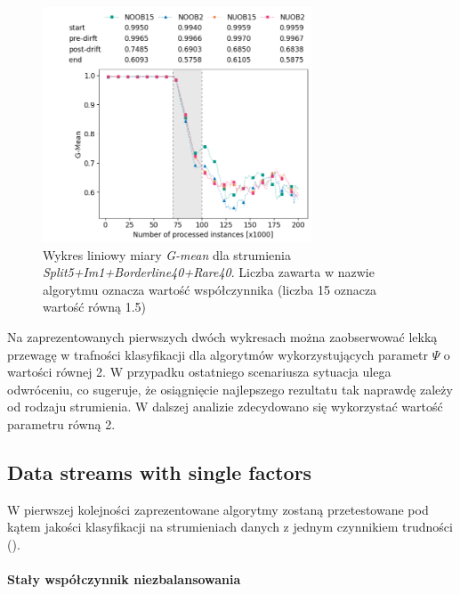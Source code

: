 \begin{figure}[h]
    \centering
    \includegraphics[width=8cm]{figures/split5im1borderline40rare40_psi.png}
    \caption{Wykres liniowy miary \textit{G-mean} dla strumienia \textit{Split5+Im1+Borderline40+Rare40}. Liczba zawarta w nazwie algorytmu oznacza wartość współczynnika (liczba 15 oznacza wartość równą 1.5)}\label{Figure:PsiParametrization2}
\end{figure}

\noindent Na zaprezentowanych pierwszych dwóch wykresach można zaobserwować lekką przewagę w trafności klasyfikacji dla algorytmów wykorzystujących parametr $\Psi$ o wartości równej 2. W przypadku ostatniego scenariusza sytuacja ulega odwróceniu, co sugeruje, że osiągnięcie najlepszego rezultatu tak naprawdę zależy od rodzaju strumienia. W dalszej analizie zdecydowano się wykorzystać wartość parametru równą 2.

\newpage

\subsection{Data streams with single factors}

\noindent W pierwszej kolejności zaprezentowane algorytmy zostaną przetestowane pod kątem jakości klasyfikacji na strumieniach danych z jednym czynnikiem trudności ().\\\\
\textbf{Stały współczynnik niezbalansowania}\\

